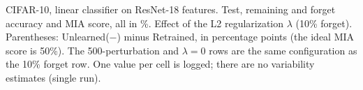 \begin{table}[t]
  \centering
  
  \caption{CIFAR-10, linear classifier on ResNet-18 features. Test, remaining and forget accuracy and MIA score, all in \%. Effect of the L2 regularization $\lambda$ (10\% forget). Parentheses: Unlearned($-$) minus Retrained, in percentage points (the ideal MIA score is 50\%). The 500-perturbation and $\lambda{=}0$ rows are the same configuration as the 10\% forget row. One value per cell is logged; there are no variability estimates (single run).}
  \label{tab:lambda}
\end{table}
